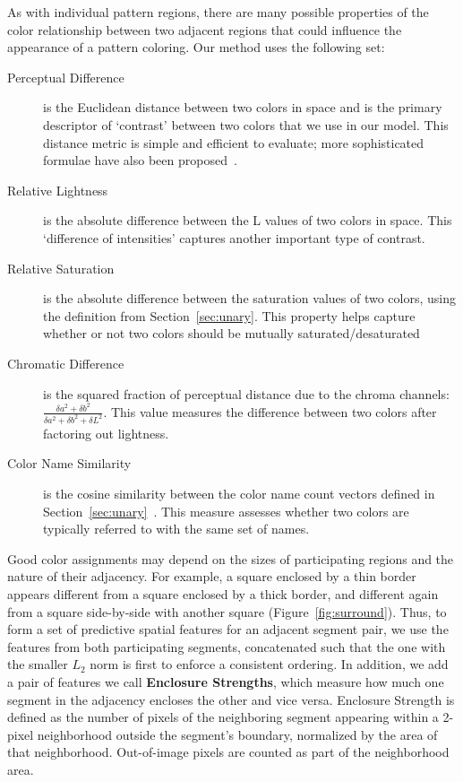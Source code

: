 As with individual pattern regions, there are many possible properties of the color relationship between two adjacent regions that could influence the appearance of a pattern coloring. Our method uses the following set:
\begin{description}
	\item[Perceptual Difference] is the Euclidean distance between two colors in \lab space and is the primary descriptor of `contrast' between two colors that we use in our model. This distance metric is simple and efficient to evaluate; more sophisticated formulae have also been proposed~\cite{CIEDE2000}.
	\item[Relative Lightness] is the absolute difference between the L values of two colors in \lab space. This `difference of intensities' captures another important type of contrast.
	\item[Relative Saturation] is the absolute difference between the saturation values of two colors, using the definition from Section~\ref{sec:unary}. This property helps capture whether or not two colors should be mutually saturated/desaturated
	\item[Chromatic Difference] is the squared fraction of perceptual distance due to the \lab chroma channels: $\frac{\delta a^2+\delta b^2}{\delta a^2+\delta b^2+\delta L^2}$. This value measures the difference between two colors after factoring out lightness.
	\item[Color Name Similarity] is the cosine similarity between the color name count vectors defined in Section~\ref{sec:unary}~\cite{ColorNamingModels}. This measure assesses whether two colors are typically referred to with the same set of names.
\end{description}
Good color assignments may depend on the sizes of participating regions and the nature of their adjacency. For example, a square enclosed by a thin border appears different from a square enclosed by a thick border, and different again from a square side-by-side with another square (Figure~\ref{fig:surround}). Thus, to form a set of predictive spatial features for an adjacent segment pair, we use the features from both participating segments, concatenated such that the one with the smaller $L_2$ norm is first to enforce a consistent ordering. In addition, we add a pair of features we call \textbf{Enclosure Strengths}, which measure how much one segment in the adjacency encloses the other and vice versa. Enclosure Strength is defined as the number of pixels of the neighboring segment appearing within a 2-pixel neighborhood outside the segment's boundary, normalized by the area of that neighborhood. Out-of-image pixels are counted as part of the neighborhood area.

